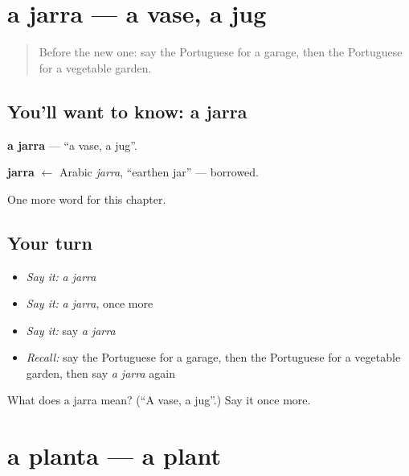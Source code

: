\section[a jarra]{a jarra — a vase, a jug}

\label{lesson:PT-C224-jarra}



\begin{quote}
Before the new one: say the Portuguese for a garage, then the Portuguese for a vegetable garden.
\end{quote}

\subsection*{You'll want to know: a jarra}
\textbf{a jarra} — \textquotedblleft{}a vase, a jug\textquotedblright{}.

\begin{cousinweb}
\textbf{jarra} $\leftarrow$ Arabic \emph{jarra}, \textquotedblleft{}earthen jar\textquotedblright{} — borrowed.
\end{cousinweb}

\begin{grammarlens}[title={What you've built}]
One more word for this chapter.
\end{grammarlens}

\subsection*{Your turn}
\begin{itemize}
\raggedright
  \item \emph{Say it:} \emph{a jarra}
  \item \emph{Say it:} \emph{a jarra}, once more
  \item \emph{Say it:} say \emph{a jarra}
  \item \emph{Recall:} say the Portuguese for a garage, then the Portuguese for a vegetable garden, then say \emph{a jarra} again
\end{itemize}

\begin{tcolorbox}[breakable,colback=teal!4,colframe=teal!35!black,title={Before you move on}]
What does a jarra mean? (\textquotedblleft{}A vase, a jug\textquotedblright{}.) Say it once more.
\end{tcolorbox}
\section[a planta]{a planta — a plant}

